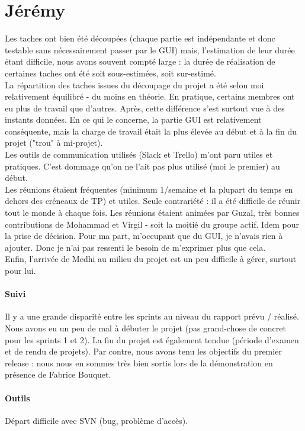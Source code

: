 \documentclass[a4paper,12pt]{article}
\begin{document}
\section{Jérémy}
Les taches ont bien été découpées (chaque partie est indépendante et donc testable sans nécessairement passer par le GUI) mais, l'estimation de leur durée étant difficile, nous avons souvent compté large : la durée de réalisation de certaines taches ont été soit sous-estimées, soit sur-estimé.\\
La répartition des taches issues du découpage du projet a été selon moi relativement équilibré - du moins en théorie. En pratique, certains membres ont eu plus de travail que d'autres. Après, cette différence s'est surtout vue à des instants données. En ce qui le concerne, la partie GUI est relativement conséquente, mais la charge de travail était la plus élevée au début et à la fin du projet ("trou" à mi-projet).\\
Les outils de communication utilisés (Slack et Trello) m'ont paru utiles et pratiques. C'est dommage qu'on ne l'ait pas plus utilisé (moi le premier) au début.\\
Les réunions étaient fréquentes (minimum 1/semaine et la plupart du temps en dehors des créneaux de TP) et utiles. Seule contrariété : il a été difficile de réunir tout le monde à chaque fois. Les réunions étaient animées par Guzal, très bonnes contributions de Mohammad et Virgil - soit la moitié du groupe actif. Idem pour la prise de décision. Pour ma part, m'occupant que du GUI, je n'avais rien à ajouter. Donc je n'ai pas ressenti le besoin de m'exprimer plus que cela.\\
Enfin, l'arrivée de Medhi au milieu du projet est un peu difficile à gérer, surtout pour lui.\\
\paragraph{Suivi}
Il y a une grande disparité entre les sprints au niveau du rapport prévu / réalisé. Nous avons eu un peu de mal à débuter le projet (pas grand-chose de concret pour les sprints 1 et 2). La fin du projet est également tendue (période d'examen et de rendu de projets). Par contre, nous avons tenu les objectifs du premier release : nous nous en sommes très bien sortis lors de la démonstration en présence de Fabrice Bouquet.
\paragraph{Outils}
Départ difficile avec SVN (bug, problème d'accès).
\end{document}
